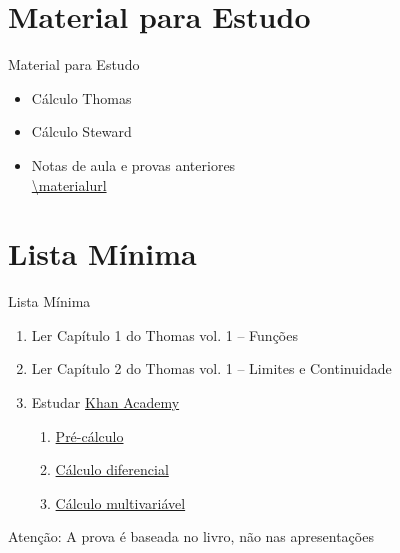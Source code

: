 \documentclass[fleqn,utf8,aspectratio=169,12pt]{beamer}
\begin{document}
\section{Material para Estudo}

\begin{frame}{Material para Estudo}
  \begin{itemize}[<+->]
    \item Cálculo Thomas
    \item Cálculo Steward
    \item Notas de aula e provas anteriores \\[2mm]
          \url{\materialurl}
  \end{itemize}
\end{frame}

\section{Lista Mínima}

\begin{frame}{Lista Mínima}
  \begin{enumerate}
    \item Ler Capítulo 1 do Thomas vol. 1 -- Funções
    \item Ler Capítulo 2 do Thomas vol. 1 -- Limites e Continuidade
    \item Estudar \href{https://pt.khanacademy.org}{Khan Academy}
    \begin{enumerate}
      \item \href{https://pt.khanacademy.org/math/precalculus}{Pré-cálculo}
      \item \href{https://pt.khanacademy.org/math/differential-calculus}{Cálculo diferencial}
      \item \href{https://pt.khanacademy.org/math/multivariable-calculus}{Cálculo multivariável}
    \end{enumerate}
  \end{enumerate}

  \vfill
  Atenção: A prova é baseada no livro, não nas apresentações
\end{frame}

\end{document}
